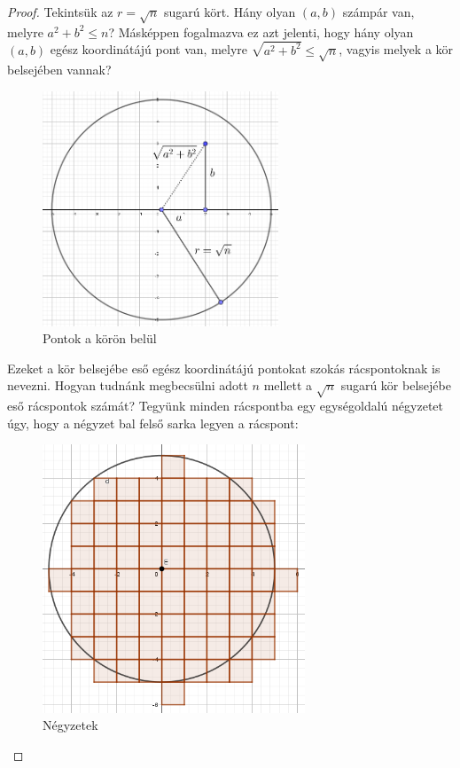 \documentclass[12pt]{book}
\theoremstyle{plain} %
\theoremstyle{definition} %
\theoremstyle{remark}
\numberwithin{equation}{section}  %
\begin{document}
	\begin{proof}
		Tekintsük az $r=\sqrt{n}$ sugarú kört. Hány olyan $(a,b)$ számpár van, melyre $a^2+b^2\leq n$? Másképpen fogalmazva ez azt jelenti, hogy hány olyan $(a,b)$ egész koordinátájú pont van, melyre $\sqrt{a^2+b^2}\leq \sqrt{n}$, vagyis melyek a kör belsejében vannak?
		
		\begin{figure}[h] %
			\centering
			\includegraphics[height=7cm]{abszampar1.png}
			\caption{Pontok a körön belül}\label{abszampar1}
		\end{figure}
	
		Ezeket a kör belsejébe eső egész koordinátájú pontokat szokás rácspontoknak is nevezni. Hogyan tudnánk megbecsülni adott $n$ mellett a $\sqrt{n}$ sugarú kör belsejébe eső rácspontok számát? Tegyünk minden rácspontba egy egységoldalú négyzetet úgy, hogy a négyzet bal felső sarka legyen a rácspont:
		
		\begin{figure}[h] %
			\centering
			\includegraphics[height=8cm]{abszampar2.png}
			\caption{Négyzetek}\label{abszampar2}
		\end{figure}
		

\end{proof}
\end{document}
